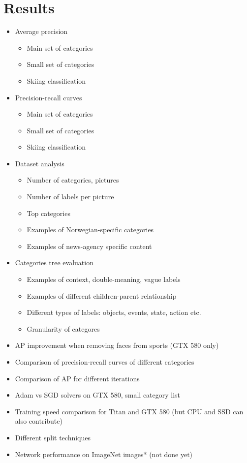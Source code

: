 \chapter{Results}
\label{chap:results}

\begin{itemize}
    \item Average precision
    \begin{itemize}
        \item Main set of categories
        \item Small set of categories
        \item Skiing classification
    \end{itemize}
    \item Precision-recall curves
    \begin{itemize}
        \item Main set of categories
        \item Small set of categories
        \item Skiing classification
    \end{itemize}
    \item Dataset analysis
    \begin{itemize}
        \item Number of categories, pictures
        \item Number of labels per picture
        \item Top categories
        \item Examples of Norwegian-specific categories
        \item Examples of news-agency specific content
    \end{itemize}
    \item Categories tree evaluation
    \begin{itemize}
        \item Examples of context, double-meaning, vague labels
        \item Examples of different children-parent relationship
        \item Different types of labels: objects, events, state, action etc.
        \item Granularity of categores
    \end{itemize}
    \item AP improvement when removing faces from sports (GTX 580 only)
    \item Comparison of precision-recall curves of different categories
    \item Comparison of AP for different iterations
    \item Adam vs SGD solvers on GTX 580, small category list
    \item Training speed comparison for Titan and GTX 580 (but CPU and SSD can also contribute)
    \item Different split techniques
    \item Network performance on ImageNet images* (not done yet)
\end{itemize}



